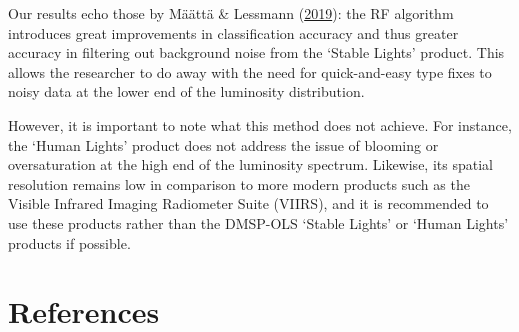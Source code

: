 \documentclass[11pt,preprint, authoryear]{elsarticle}
\numberwithin{equation}{section}
\numberwithin{figure}{section}
\numberwithin{table}{section}
\begin{document}
Our results echo those by Määttä \& Lessmann
(\protect\hyperlink{ref-maatta}{2019}): the RF algorithm introduces
great improvements in classification accuracy and thus greater accuracy
in filtering out background noise from the `Stable Lights' product. This
allows the researcher to do away with the need for quick-and-easy type
fixes to noisy data at the lower end of the luminosity distribution.

However, it is important to note what this method does not achieve. For
instance, the `Human Lights' product does not address the issue of
blooming or oversaturation at the high end of the luminosity spectrum.
Likewise, its spatial resolution remains low in comparison to more
modern products such as the Visible Infrared Imaging Radiometer Suite
(VIIRS), and it is recommended to use these products rather than the
DMSP-OLS `Stable Lights' or `Human Lights' products if possible.

\newpage

\hypertarget{references}{%
\section*{References}\label{references}}
\end{document}
